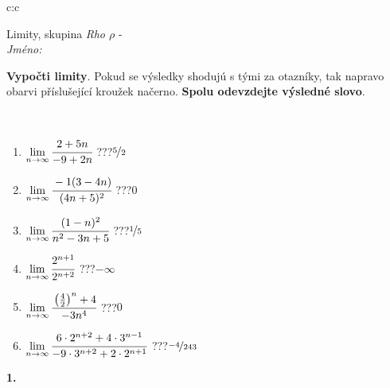 \documentclass[10pt]{report}
\begin{document}
\begin{tabular}{c:c}
\begin{minipage}[c][104.5mm][t]{0.5\linewidth}
\begin{center}
\vspace{7mm}
{\huge Limity, skupina \textit{Rho $\rho$} -}\\[5mm]
\textit{Jméno:}\phantom{xxxxxxxxxxxxxxxxxxxxxxxxxxxxxxxxxxxxxxxxxxxxxxxxxxxxxxxxxxxxxxxxx}\\[5mm]
\begin{minipage}{0.95\linewidth}
\begin{center}
\textbf{Vypočti limity}. Pokud se výsledky shodujú s tými za otazníky, tak napravo\\obarvi příslušející kroužek načerno. \textbf{Spolu odevzdejte výsledné slovo}.
\end{center}
\end{minipage}
\\[1mm]
\begin{minipage}{0.79\linewidth}
\begin{center}
\begin{varwidth}{\linewidth}
\begin{enumerate}
\normalsize
\item $\lim\limits_{n\to\infty}\cfrac{2+5n}{-9+2n}$\quad \dotfill\; ???\;\dotfill \quad $\nicefrac{5}{2}$
\item $\lim\limits_{n\to\infty}\cfrac{-1(3-4n)}{(4n+5)^2}$\quad \dotfill\; ???\;\dotfill \quad $0$
\item $\lim\limits_{n\to\infty}\cfrac{(1-n)^2}{n^2-3n+5}$\quad \dotfill\; ???\;\dotfill \quad $\nicefrac{1}{5}$
\item $\lim\limits_{n\to\infty}\cfrac{2^{n+1}}{2^{n+2}}$\quad \dotfill\; ???\;\dotfill \quad $-\infty$
\item $\lim\limits_{n\to\infty}\cfrac{\left(\frac{4}{2}\right)^n +4}{-3n^{4}}$\quad \dotfill\; ???\;\dotfill \quad $0$
\item $\lim\limits_{n\to\infty}\cfrac{6\cdot 2^{n+2}+4\cdot 3^{n-1}}{-9\cdot 3^{n+2}+2\cdot 2^{n+1}}$\quad \dotfill\; ???\;\dotfill \quad $\nicefrac{-4}{243}$
\end{enumerate}
\end{varwidth}
\end{center}
\end{minipage}
\begin{minipage}{0.20\linewidth}
\begin{center}
{\Huge\bfseries 1.} \\[2mm]

\end{center}
\end{minipage}
\end{center}
\end{minipage}
\end{tabular}
\end{document}
